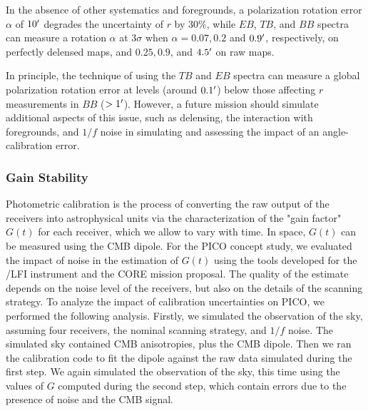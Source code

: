 \documentclass[PICOReport.tex]{subfiles}
\begin{document}
In the absence of other systematics and foregrounds, a polarization rotation error $\alpha$ of $10'$ degrades 
the uncertainty of $r$ by 30\%, while $EB$, $TB$, and $BB$ spectra can measure a rotation $\alpha$ at 3$\sigma$ when $\alpha = 0.07, 0.2$  and $0.9'$, respectively,
 on perfectly delensed maps, and $0.25, 0.9$, and $4.5'$ on raw maps.

In principle, the technique of using the $TB$ and $EB$ spectra can measure a global polarization rotation error at levels (around $0.1 '$) below those affecting $r$ measurements in $BB$ ($> 1 '$).  However, a future mission should simulate additional aspects of this issue, such as delensing, the interaction with foregrounds, and $1/f$ noise in simulating and assessing the impact of an angle-calibration error.

\subsubsection{Gain Stability}
\label{sec:gain}



Photometric calibration is the process of converting the raw output of the receivers into astrophysical units via the characterization of the "gain factor" $G(t)$ for each receiver, which we allow to vary with time.  In space, $G(t)$ can be measured using the CMB dipole.   For the PICO concept study, we evaluated the impact of noise in the estimation of $G(t)$ using the tools developed for the \planck/LFI instrument and the CORE mission proposal. The quality of the estimate depends on the noise level of the receivers, but also on the details of the scanning strategy. 
To analyze the impact of calibration uncertainties on PICO, we performed  the following analysis. Firstly, we simulated the observation of the sky, assuming four receivers, the nominal scanning strategy, and $1/f$ noise. The simulated sky contained CMB anisotropies, plus the CMB dipole. Then we ran the calibration code to fit the dipole against the raw data simulated during the first step. We again simulated the observation of the sky, this time using the values of $G$ computed during the second step, which contain errors due to the presence of noise and the CMB signal.
\end{document}
